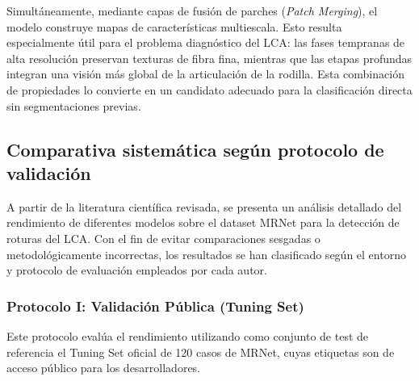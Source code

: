 Simultáneamente, mediante capas de fusión de parches (\textit{Patch Merging}), el modelo construye mapas de características multiescala. Esto resulta especialmente útil para el problema diagnóstico del LCA: las fases tempranas de alta resolución preservan texturas de fibra fina, mientras que las etapas profundas integran una visión más global de la articulación de la rodilla. Esta combinación de propiedades lo convierte en un candidato adecuado para la clasificación directa sin segmentaciones previas.

\subsection{Comparativa sistemática según protocolo de validación}

A partir de la literatura científica revisada, se presenta un análisis detallado del rendimiento de diferentes modelos sobre el dataset MRNet para la detección de roturas del LCA. Con el fin de evitar comparaciones sesgadas o metodológicamente incorrectas, los resultados se han clasificado según el entorno y protocolo de evaluación empleados por cada autor.

\subsubsection{Protocolo I: Validación Pública (Tuning Set)}

Este protocolo evalúa el rendimiento utilizando como conjunto de test de referencia el Tuning Set oficial de 120 casos de MRNet, cuyas etiquetas son de acceso público para los desarrolladores.

